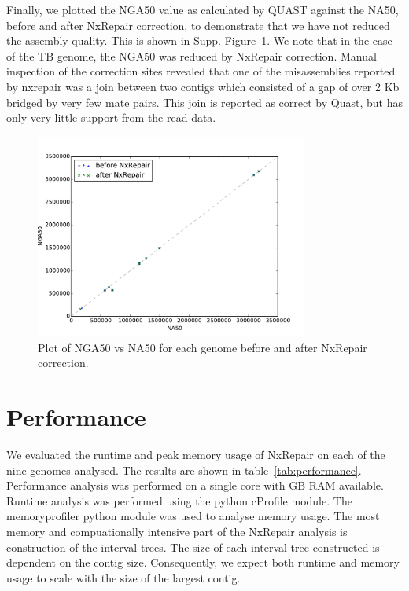 \documentclass[12pt]{article}
\begin{document}
Finally, we plotted the NGA50 value as calculated by QUAST against the NA50, before and after NxRepair correction, to demonstrate that we have not reduced the assembly quality. This is shown in Supp. Figure~\ref{fig:NGA50}. We note that in the case of the TB genome, the NGA50 was reduced by NxRepair correction. Manual inspection of the correction sites revealed that one of the misassemblies reported by nxrepair was a join between two contigs which consisted of a gap of over 2 Kb bridged by very few mate pairs. This join is reported as correct by Quast, but has only very little support from the read data.

\begin{figure}
\centerline{\includegraphics[width=0.8\textwidth]{ng50.pdf}}
\caption{Plot of NGA50 vs NA50 for each genome before and after NxRepair correction.\label{fig:NGA50}}
\end{figure}

\section{Performance}
We evaluated the runtime and peak memory usage of NxRepair on each of the nine genomes analysed. The results are shown in table~\ref{tab:performance}. Performance analysis was performed on a single core with GB RAM available. Runtime analysis was performed using the python cProfile module. The memoryprofiler python module was used to analyse memory usage. The most memory and compuationally intensive part of the NxRepair analysis is construction of the interval trees. The size of each interval tree constructed is dependent on the contig size. Consequently, we expect both runtime and memory usage to scale with the size of the largest contig. 
\end{document}
